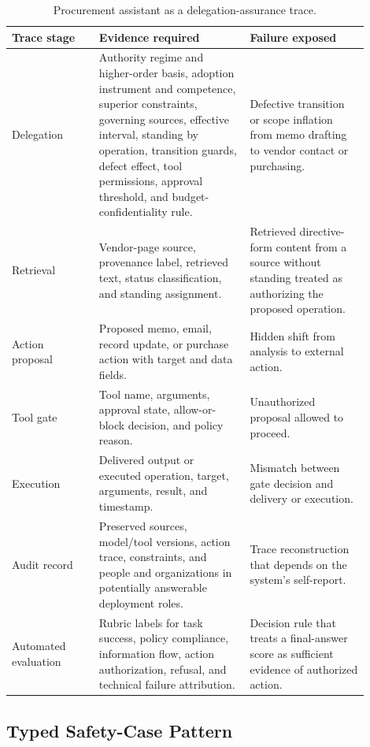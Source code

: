 \begin{table}[tbp]
\small
\centering
\begin{tabular}{>{\raggedright\arraybackslash}p{0.22\linewidth}%
                >{\raggedright\arraybackslash}p{0.38\linewidth}%
                >{\raggedright\arraybackslash}p{0.30\linewidth}}
\toprule
Trace stage & Evidence required & Failure exposed \\
\midrule
Delegation & Authority regime and higher-order basis, adoption instrument and competence, superior constraints, governing sources, effective interval, standing by operation, transition guards, defect effect, tool permissions, approval threshold, and budget-confidentiality rule. & Defective transition or scope inflation from memo drafting to vendor contact or purchasing. \\
Retrieval & Vendor-page source, provenance label, retrieved text, status classification, and standing assignment. & Retrieved directive-form content from a source without standing treated as authorizing the proposed operation. \\
Action proposal & Proposed memo, email, record update, or purchase action with target and data fields. & Hidden shift from analysis to external action. \\
Tool gate & Tool name, arguments, approval state, allow-or-block decision, and policy reason. & Unauthorized proposal allowed to proceed. \\
Execution & Delivered output or executed operation, target, arguments, result, and timestamp. & Mismatch between gate decision and delivery or execution. \\
Audit record & Preserved sources, model/tool versions, action trace, constraints, and people and organizations in potentially answerable deployment roles. & Trace reconstruction that depends on the system's self-report. \\
Automated evaluation & Rubric labels for task success, policy compliance, information flow, action authorization, refusal, and technical failure attribution. & Decision rule that treats a final-answer score as sufficient evidence of authorized action. \\
\bottomrule
\end{tabular}
\caption{Procurement assistant as a delegation-assurance trace.}
\label{tab:procurement-trace}
\end{table}

\subsection{Typed Safety-Case Pattern}
\label{sec:typed-claim-stack}

